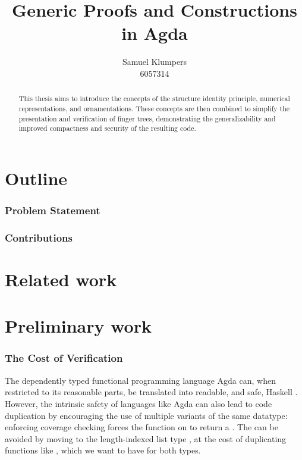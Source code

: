 \documentclass{article}
\title{Generic Proofs and Constructions in Agda}
\author{Samuel Klumpers\\6057314}
\theoremstyle{plain}%
\theoremstyle{definition}
\begin{document}
\maketitle
\tableofcontents

\newpage

\begin{abstract} %
    This thesis aims to introduce the concepts of the structure identity principle, numerical representations, and ornamentations. These concepts are then combined to simplify the presentation and verification of finger trees, demonstrating the generalizability and improved compactness and security of the resulting code. 
\end{abstract}

\part{Outline}
\section{Problem Statement}

\section{Contributions}


\part{Related work}

\part{Preliminary work}
\section{The Cost of Verification}\label{sec:intro}
The dependently typed functional programming language Agda \cite{agda} can, when restricted to its reasonable parts, be translated into readable, and safe, Haskell \cite{agda2hs}. However, the intrinsic safety of languages like Agda can also lead to code duplication by encouraging the use of multiple variants of the same datatype: enforcing coverage checking forces the  function on  to return a . The  can be avoided by moving to the length-indexed list type , at the cost of duplicating functions like \AgdaFunction{\_++\_}, which we want to have for both types.
\end{document}
